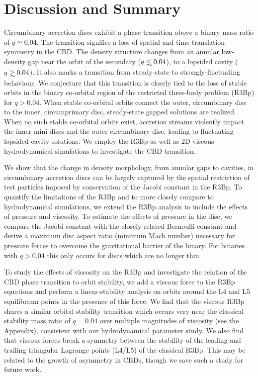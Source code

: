 \documentclass[usenatbib]{mnras}
\newcommand\lsim{\mathrel{\rlap{\lower4pt\hbox{\hskip1pt$\sim$}}
        \raise1pt\hbox{$<$}}}
\newcommand\gsim{\mathrel{\rlap{\lower4pt\hbox{\hskip1pt$\sim$}}
        \raise1pt\hbox{$>$}}}
\begin{document}
\section{Discussion and Summary}
Circumbinary accretion discs exhibit a phase transition above a binary
mass ratio of $q \simeq 0.04$. The transition signifies a loss of
spatial and time-translation symmetry in the CBD. The density
structure changes from an annular low-density gap near the orbit of
the secondary ($q\lsim 0.04$), to a lopsided cavity ($q\gsim
0.04$). It also marks a transition from steady-state to
strongly-fluctuating behaviour. We conjecture that this transition is
closely tied to the loss of stable orbits in the binary co-orbital
region of the restricted three-body problem (R3Bp) for $q>0.04$.
When stable co-orbital orbits connect the outer, circumbinary disc to the inner, circumprimary disc, steady-state gapped solutions are realized. When no such stable co-orbital orbits exist, accretion streams violently impact the inner mini-discs and the outer circumbinary disc, leading to fluctuating lopsided cavity solutions. We
employ the R3Bp as well as 2D viscous hydrodynamical simulations to
investigate the CBD transition.


We show that the change in density morphology, from annular gaps to
cavities, in circumbinary accretion discs can be largely captured by
the spatial restriction of test particles imposed by conservation of
the Jacobi constant in the R3Bp. To quantify the limitations of the
R3Bp and to more closely compare to hydrodynamical simulations, we
extend the R3Bp analysis to include the effects of pressure and
viscosity. To estimate the effects of pressure in the disc, we compare
the Jacobi constant with the closely related Bernoulli constant and
derive a maximum disc aspect ratio (minimum Mach number) necessary for
pressure forces to overcome the gravitational barrier of the
binary. For binaries with $q>0.04$ this only occurs for discs which
are no longer thin.


To study the effects of viscosity on the R3Bp and investigate the
relation of the CBD phase transition to orbit stability, we add a
viscous force to the R3Bp equations and perform a linear-stability
analysis on orbits around the L4 and L5 equilibrium points in the
presence of this force. We find that the viscous R3Bp shares a similar
orbital stability transition which occurs very near the classical
stability mass ratio of $q=0.04$ over multiple magnitudes of viscosity
(see the Appendix), consistent with our hydrodynamical parameter
study.  We also find that viscous forces break a symmetry between the
stability of the leading and trailing triangular Lagrange points
(L4/L5) of the classical R3Bp. This may be related to the growth of
asymmetry in CBDs, though we save such a study for future work.
\end{document}
